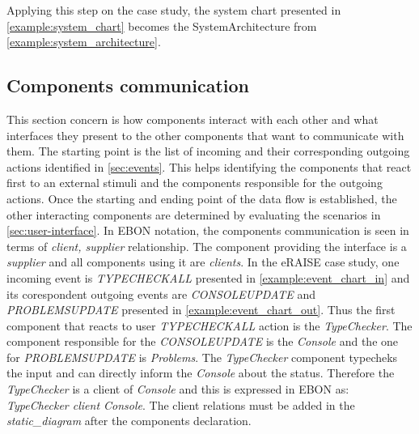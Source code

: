 \documentclass[conference]{IEEEtran}
\newcommand{\note}[1]{\todo[inline,color=red!40]{#1}}
\begin{document}


Applying this step on the case study, the system chart presented in
\autoref{example:system_chart} becomes the SystemArchitecture from
\autoref{example:system_architecture}.
%
\subsection{Components communication}
\label{sec:comp-comm}

This section concern is how components interact with each other and
what interfaces they present to the other components that want to
communicate with them. The starting point is the list of incoming and
their corresponding outgoing actions identified in
\autoref{sec:events}. This helps identifying the components that react
first to an external stimuli and the components responsible for the
outgoing actions. Once the starting and ending point of the data flow
is established, the other interacting components are determined by
evaluating the scenarios in \autoref{sec:user-interface}. In EBON
notation, the components communication is seen in terms of
\emph{client, supplier} relationship. The component providing the
interface is a \emph{supplier} and all components using it are
\emph{clients}. In the eRAISE case study, one incoming event is
\emph{TYPECHECKALL} presented in \autoref{example:event_chart_in} and
its corespondent outgoing events are \emph{CONSOLEUPDATE} and
\emph{PROBLEMSUPDATE} presented in \autoref{example:event_chart_out}.
Thus the first component that reacts to user \emph{TYPECHECKALL}
action is the \emph{TypeChecker}. The component responsible for the
\emph{CONSOLEUPDATE} is the \emph{Console} and the one for
\emph{PROBLEMSUPDATE} is \emph{Problems}. The \emph{TypeChecker}
component typecheks the input and can directly inform the
\emph{Console} about the status. Therefore the \emph{TypeChecker} is a
client of \emph{Console} and this is expressed in EBON as: \emph{
TypeChecker client Console}. The client relations must be added in the
\emph{static\_diagram} after the components declaration.

\end{document}
